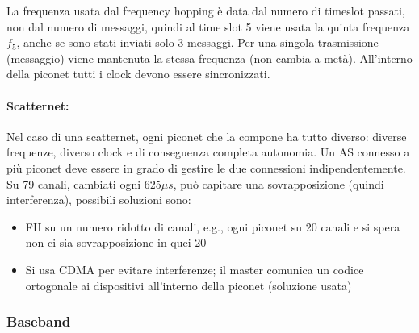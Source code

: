 La frequenza usata dal frequency hopping è data dal numero di timeslot passati, non dal numero di messaggi, quindi al time slot 5 viene usata la quinta frequenza $f_5$, anche se sono stati inviati solo 3 messaggi. Per una singola trasmissione (messaggio) viene mantenuta la stessa frequenza (non cambia a metà). All'interno della piconet tutti i clock devono essere sincronizzati.\\

\paragraph{Scatternet:} Nel caso di una scatternet, ogni piconet che la compone ha tutto diverso: diverse frequenze, diverso clock e di conseguenza completa autonomia. Un AS connesso a più piconet deve essere in grado di gestire le due connessioni indipendentemente.\\

Su 79 canali, cambiati ogni $625 \mu s$, può capitare una sovrapposizione (quindi interferenza), possibili soluzioni sono: 
\begin{itemize}
	\item FH su un numero ridotto di canali, e.g., ogni piconet su 20 canali e si spera non ci sia sovrapposizione in quei 20
	\item Si usa CDMA per evitare interferenze; il master comunica un codice ortogonale ai dispositivi all'interno della piconet (soluzione usata)
\end{itemize}

\newpage

\subsubsection{Baseband}

